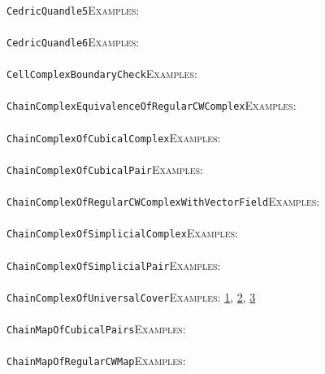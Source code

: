 \documentclass[a4paper,11pt]{report}
\begin{document}
{{ \\
 \texttt{Cedric{\textunderscore}Quandle5}{\nobreakspace}{\nobreakspace}{\nobreakspace}{\nobreakspace}\textsc{Examples:} \\
 \\
 \texttt{Cedric{\textunderscore}Quandle6}{\nobreakspace}{\nobreakspace}{\nobreakspace}{\nobreakspace}\textsc{Examples:} \\
 \\
 \texttt{CellComplexBoundaryCheck}{\nobreakspace}{\nobreakspace}{\nobreakspace}{\nobreakspace}\textsc{Examples:} \\
 \\
 \texttt{ChainComplexEquivalenceOfRegularCWComplex}{\nobreakspace}{\nobreakspace}{\nobreakspace}{\nobreakspace}\textsc{Examples:} \\
 \\
 \texttt{ChainComplexOfCubicalComplex}{\nobreakspace}{\nobreakspace}{\nobreakspace}{\nobreakspace}\textsc{Examples:} \\
 \\
 \texttt{ChainComplexOfCubicalPair}{\nobreakspace}{\nobreakspace}{\nobreakspace}{\nobreakspace}\textsc{Examples:} \\
 \\
 \texttt{ChainComplexOfRegularCWComplexWithVectorField}{\nobreakspace}{\nobreakspace}{\nobreakspace}{\nobreakspace}\textsc{Examples:} \\
 \\
 \texttt{ChainComplexOfSimplicialComplex}{\nobreakspace}{\nobreakspace}{\nobreakspace}{\nobreakspace}\textsc{Examples:} \\
 \\
 \texttt{ChainComplexOfSimplicialPair}{\nobreakspace}{\nobreakspace}{\nobreakspace}{\nobreakspace}\textsc{Examples:} \\
 \\
 \texttt{ChainComplexOfUniversalCover}{\nobreakspace}{\nobreakspace}{\nobreakspace}{\nobreakspace}\textsc{Examples:} \href{tutorial/chap3.html} {1}{\nobreakspace}, \href{../www/SideLinks/About/aboutCoveringSpaces.html} {2}{\nobreakspace}, \href{../www/SideLinks/About/aboutCoverinSpaces.html} {3}{\nobreakspace} \\
 \\
 \texttt{ChainMapOfCubicalPairs}{\nobreakspace}{\nobreakspace}{\nobreakspace}{\nobreakspace}\textsc{Examples:} \\
 \\
 \texttt{ChainMapOfRegularCWMap}{\nobreakspace}{\nobreakspace}{\nobreakspace}{\nobreakspace}\textsc{Examples:} \\
}}
\end{document}
